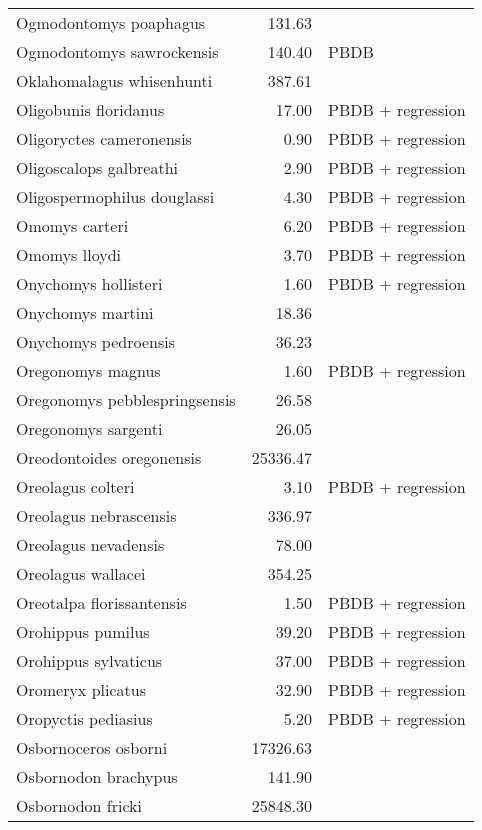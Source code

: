 \begin{table}[ht]
\begin{tabular}{lrl}
  Ogmodontomys poaphagus & 131.63 & \cite{Tomiya2013} \\ 
  Ogmodontomys sawrockensis & 140.40 & PBDB \\ 
  Oklahomalagus whisenhunti & 387.61 & \cite{Tomiya2013} \\ 
  Oligobunis floridanus & 17.00 & PBDB + regression \\ 
  Oligoryctes cameronensis & 0.90 & PBDB + regression \\ 
  Oligoscalops galbreathi & 2.90 & PBDB + regression \\ 
  Oligospermophilus douglassi & 4.30 & PBDB + regression \\ 
  Omomys carteri & 6.20 & PBDB + regression \\ 
  Omomys lloydi & 3.70 & PBDB + regression \\ 
  Onychomys hollisteri & 1.60 & PBDB + regression \\ 
  Onychomys martini & 18.36 & \cite{Tomiya2013} \\ 
  Onychomys pedroensis & 36.23 & \cite{Tomiya2013} \\ 
  Oregonomys magnus & 1.60 & PBDB + regression \\ 
  Oregonomys pebblespringsensis & 26.58 & \cite{Tomiya2013} \\ 
  Oregonomys sargenti & 26.05 & \cite{Tomiya2013} \\ 
  Oreodontoides oregonensis & 25336.47 & \cite{Tomiya2013} \\ 
  Oreolagus colteri & 3.10 & PBDB + regression \\ 
  Oreolagus nebrascensis & 336.97 & \cite{Tomiya2013} \\ 
  Oreolagus nevadensis & 78.00 & \cite{McKenna2011} \\ 
  Oreolagus wallacei & 354.25 & \cite{Tomiya2013} \\ 
  Oreotalpa florissantensis & 1.50 & PBDB + regression \\ 
  Orohippus pumilus & 39.20 & PBDB + regression \\ 
  Orohippus sylvaticus & 37.00 & PBDB + regression \\ 
  Oromeryx plicatus & 32.90 & PBDB + regression \\ 
  Oropyctis pediasius & 5.20 & PBDB + regression \\ 
  Osbornoceros osborni & 17326.63 & \cite{Tomiya2013} \\ 
  Osbornodon brachypus & 141.90 & \cite{Chester2012} \\ 
  Osbornodon fricki & 25848.30 & \cite{Tomiya2013} \\ 

\end{tabular}
\end{table}
